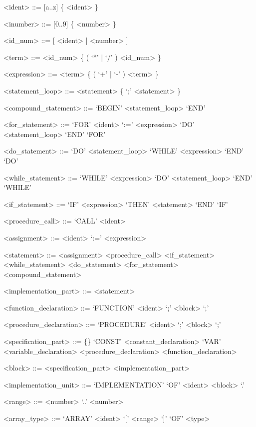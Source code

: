 \documentclass[]{article}
\begin{document}
\setlength{\grammarparsep}{20pt plus 1pt minus 1pt} %
\setlength{\grammarindent}{12em} %

\begin{grammar}
	
	<ident> ::= [a..z] \{ <ident> \}
	
	<inumber> ::= [0..9] \{ <number> \}
	
	<id_num> ::= [ <ident> | <number> ]
	
	<term> ::= <id_num> \{ ( `*'  | `/' ) <id_num> \}
	
	<expression> ::= <term> \{ ( `+' | `-' ) <term> \}
	
	<statement_loop> ::= <statement> \{  `;' <statement> \}
	
	<compound_statement> ::= `BEGIN' <statement_loop> `END'
	
	<for_statement> ::= `FOR' <ident> `:=' <expression> `DO' <statement_loop> `END'  `FOR'
	
	<do_statement> ::= `DO' <statement_loop> `WHILE' <expression> `END' `DO'
	
	<while_statement> ::= `WHILE' <expression> `DO' <statement_loop> `END' `WHILE'
	
	<if_statement> ::= `IF' <expression> `THEN' <statement> `END' `IF'
	
	<procedure_call> ::= `CALL' <ident>
	
	<assignment> ::= <ident> `:=' <expression>
	
	<statement> ::= <assignment>
	\alt <procedure_call>
	\alt <if_statement>
	\alt <while_statement>
	\alt <do_statement>
	\alt <for_statement>
	\alt <compound_statement>
	
	<implementation_part> ::= <statement>
	
	<function_declaration> ::= `FUNCTION' <ident> `;' <block> `;'
	
	<procedure_declaration> ::= `PROCEDURE' <ident> `;' <block> `;'
	
	<specification_part> ::= \{\}
    \alt `CONST' <constant_declaration>
	\alt `VAR' <variable_declaration>
	\alt <procedure_declaration>
	\alt <function_declaration>

	<block> ::= <specification_part> <implementation_part>
	
	<implementation_unit> ::= `IMPLEMENTATION' `OF' <ident> <block> `.'
	
	<range> ::= <number> `..' <number>
	
	<array_type> ::= `ARRAY' <ident> `[' <range> `]' `OF' <type>
	

\end{grammar}
\end{document}
